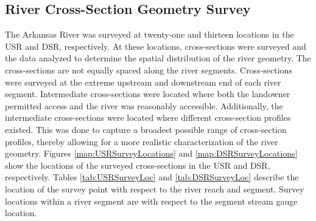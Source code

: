 \begin{linenumbers}
\section{River Cross-Section Geometry Survey}
The Arkansas River was surveyed at twenty-one and thirteen locations in the USR and DSR, respectively.  At these locations, cross-sections were surveyed and the data analyzed to determine the spatial distribution of the river geometry.  The cross-sections are not equally spaced along the river segments.  Cross-sections were surveyed at the extreme upstream and downstream end of each river segment.  Intermediate cross-sections were located where both the landowner permitted access and the river was reasonably accessible.  Additionally, the intermediate cross-sections were located where different cross-section profiles existed.  This was done to capture a broadest possible range of cross-section profiles, thereby allowing for a more realistic characterization of the river geometry.  Figures \ref{map:USRSurveyLocations} and \ref{map:DSRSurveyLocations} show the locations of the surveyed cross-sections in the USR and DSR, respectively.  Tables \ref{tab:USRSurveyLoc} and \ref{tab:DSRSurveyLoc} describe the location of the survey point with respect to the river reach and segment.  Survey locations within a river segment are with respect to the segment stream gauge location.



\end{linenumbers}
